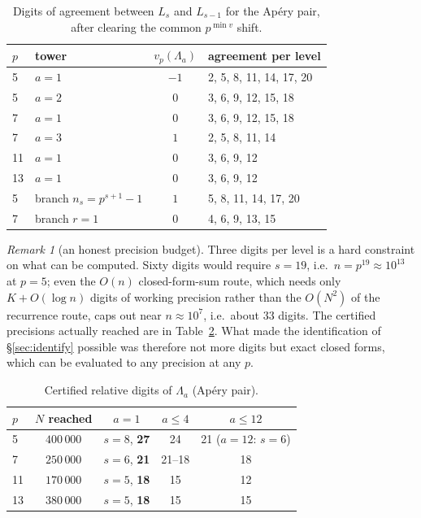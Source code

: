 \documentclass[11pt,reqno]{article}
\newcommand{\vp}{v_p}
\theoremstyle{plain}
\theoremstyle{definition}
\theoremstyle{remark}
\newtheorem{remark}[theorem]{Remark}
\numberwithin{equation}{section}
\begin{document}
\begin{table}[h]
\centering\small
\caption{Digits of agreement between $L_s$ and $L_{s-1}$ for the Ap\'ery pair,
after clearing the common $p^{\min v}$ shift.}
\label{tab:aperyrate}
\begin{tabular}{@{}llcl@{}}
\toprule
$p$ & tower & $\vp(\Lambda_a)$ & agreement per level\\
\midrule
5 & $a=1$ & $-1$ & 2, 5, 8, 11, 14, 17, 20\\
5 & $a=2$ & $0$ & 3, 6, 9, 12, 15, 18\\
7 & $a=1$ & $0$ & 3, 6, 9, 12, 15, 18\\
7 & $a=3$ & $1$ & 2, 5, 8, 11, 14\\
11 & $a=1$ & $0$ & 3, 6, 9, 12\\
13 & $a=1$ & $0$ & 3, 6, 9, 12\\
5 & branch $n_s=p^{s+1}-1$ & $1$ & 5, 8, 11, 14, 17, 20\\
7 & branch $r=1$ & $0$ & 4, 6, 9, 13, 15\\
\bottomrule
\end{tabular}
\end{table}

\begin{remark}[an honest precision budget]\label{rem:precision}
Three digits per level is a hard constraint on what can be computed.  Sixty
digits would require $s=19$, i.e.\ $n=p^{19}\approx10^{13}$ at $p=5$; even the
$O(n)$ closed-form-sum route, which needs only $K+O(\log n)$ digits of working
precision rather than the $O(N^2)$ of the recurrence route, caps out near
$n\approx10^7$, i.e.\ about $33$ digits.  The certified precisions actually
reached are in Table~\ref{tab:precision}.  What made the identification of
\S\ref{sec:identify} possible was therefore not more digits but exact closed
forms, which can be evaluated to any precision at any $p$.
\end{remark}

\begin{table}[h]
\centering\small
\caption{Certified relative digits of $\Lambda_a$ (Ap\'ery pair).}
\label{tab:precision}
\begin{tabular}{@{}lcccc@{}}
\toprule
$p$ & $N$ reached & $a=1$ & $a\le4$ & $a\le12$\\
\midrule
5 & $400\,000$ & $s=8$, \textbf{27} & 24 & 21 ($a=12$: $s=6$)\\
7 & $250\,000$ & $s=6$, \textbf{21} & 21--18 & 18\\
11 & $170\,000$ & $s=5$, \textbf{18} & 15 & 12\\
13 & $380\,000$ & $s=5$, \textbf{18} & 15 & 15\\
\bottomrule
\end{tabular}
\end{table}
\end{document}
